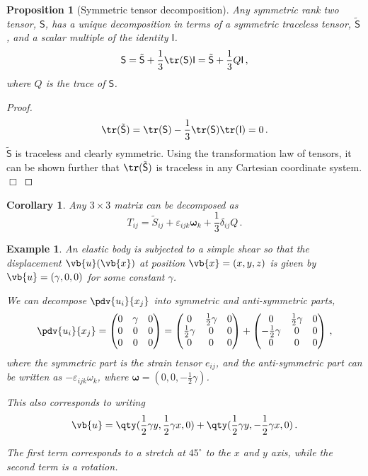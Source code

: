 \documentclass{article}
\theoremstyle{plain}\theoremheaderfont{\normalfont\itshape}\theorembodyfont{\rmfamily}\theoremseparator{.}\newtheorem*{rem}{Remark}\newtheorem*{ex}{Example}\newtheorem*{proof}{Proof}\newtheorem*{altp}{Alternative proof}
\theoremstyle{plain}\theoremheaderfont{\normalfont\bfseries}\theorembodyfont{\rmfamily}\theoremseparator{.}\newtheorem{thm}{Theorem}[section]\newtheorem{lem}[thm]{Lemma}\newtheorem{prop}[thm]{Proposition}\newtheorem*{cor}{Corollary}\newtheorem{defn}[thm]{Definition}\newtheorem{clm}[thm]{Claim}\newtheorem{clminproof}{Claim}
\theoremstyle{break}\theoremheaderfont{\normalfont\itshape}\theorembodyfont{\rmfamily}\theoremseparator{.\medskip}\newtheorem*{proofskip}{Proof}\newtheorem*{exs}{Examples}\newtheorem*{rems}{Remarks}
\theoremstyle{break}\theoremheaderfont{\normalfont\bfseries}\theorembodyfont{\rmfamily}\theoremseparator{.\medskip}\newtheorem{lemskip}[thm]{Lemma}\newtheorem{defnskip}[thm]{Definition}\newtheorem{propskip}[thm]{Proposition}\newtheorem{thmskip}[thm]{Theorem}
\numberwithin{equation}{section}
\newcommand{\qed}{\hfill\ensuremath{\Box}}
\begin{document}
	\begin{prop}[Symmetric tensor decomposition]
		Any symmetric rank two tensor, \(\mathsf{S}\), has a unique decomposition in terms of a symmetric traceless tensor, \(\tilde{\mathsf{S}}\), and a scalar multiple of the identity \(\mathsf{I}\).
		\[\mathsf{S}=\tilde{\mathsf{S}}+\frac{1}{3}\tr(\mathsf{S})\mathsf{I}=\tilde{\mathsf{S}}+\frac{1}{3}Q\mathsf{I}\,,\]
		where \(Q\) is the trace of \(\mathsf{S}\).
	\end{prop}
	\begin{proof}
		\[\tr\,\!(\tilde{\mathsf{S}})=\tr(\mathsf{S})-\frac{1}{3}\tr(\mathsf{S})\tr(\mathsf{I})=0\,.\]
		\(\tilde{\mathsf{S}}\) is traceless and clearly symmetric. Using the transformation law of tensors, it can be shown further that \(\tr\,\!(\tilde{\mathsf{S}})\) is traceless in any Cartesian coordinate system.\qed
	\end{proof}
	\begin{cor}
		Any \(3\times 3\) matrix can be decomposed as
		\[T_{ij}=\tilde{S}_{ij}+\varepsilon_{ijk}\bm{\omega}_k+\frac{1}{3}\delta_{ij}Q\,.\]
	\end{cor}
	\begin{ex}
		An elastic body is subjected to a simple shear so that the displacement \(\vb{u}(\vb{x})\) at position \(\vb{x}=(x,y,z)\) is given by \(\vb{u}=(\gamma,0,0)\) for some constant \(\gamma\).

		We can decompose \(\pdv{u_i}{x_j}\) into symmetric and anti-symmetric parts,
		\[\pdv{u_i}{x_j}=\begin{pmatrix}
			0 & \gamma & 0\\
			0 & 0 & 0\\
			0 & 0 & 0
		\end{pmatrix}=\begin{pmatrix}
			0 & \frac{1}{2}\gamma & 0\\
			\frac{1}{2}\gamma & 0 & 0\\
			0 & 0 & 0
		\end{pmatrix}+\begin{pmatrix}
			0 & \frac{1}{2}\gamma & 0\\
			-\frac{1}{2}\gamma & 0 & 0\\
			0 & 0 & 0
		\end{pmatrix}\,,\]
		where the symmetric part is the strain tensor \(e_{ij}\), and the anti-symmetric part can be written as \(-\varepsilon_{ijk}\omega_k\), where \(\bm{\omega}=(0,0,-\frac{1}{2}\gamma)\).

		This also corresponds to writing
		\[\vb{u}=\qty(\frac{1}{2}\gamma y,\frac{1}{2}\gamma x,0)+\qty(\frac{1}{2}\gamma y,-\frac{1}{2}\gamma x,0)\,.\]

		The first term corresponds to a stretch at \(45^\circ\) to the \(x\) and \(y\) axis, while the second term is a rotation.
	\end{ex}
\end{document}
